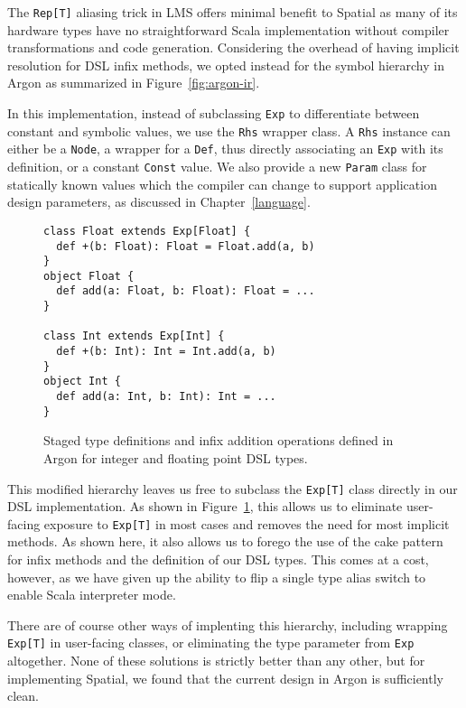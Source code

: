 The \texttt{Rep[T]} aliasing trick in LMS offers minimal benefit to Spatial as many of its hardware types have no straightforward Scala implementation without compiler transformations and code generation.
Considering the overhead of having implicit resolution for DSL infix methods, we opted instead for the symbol hierarchy in Argon as summarized in Figure~\ref{fig:argon-ir}.

In this implementation, instead of subclassing
\texttt{Exp} to differentiate between constant and symbolic values, we
use the \texttt{Rhs} wrapper class. A \texttt{Rhs} instance can either
be a \texttt{Node}, a wrapper for a \texttt{Def}, thus directly associating an \texttt{Exp} with its definition, or a constant \texttt{Const} value.
We also provide a new \texttt{Param} class for statically known values which
the compiler can change to support application design parameters, as discussed in Chapter~\ref{language}.

\begin{figure}
\begin{lstlisting}[language=ScalaBig]
class Float extends Exp[Float] {
  def +(b: Float): Float = Float.add(a, b)
}
object Float {
  def add(a: Float, b: Float): Float = ...
}

class Int extends Exp[Int] {
  def +(b: Int): Int = Int.add(a, b)
}
object Int {
  def add(a: Int, b: Int): Int = ...
}
\end{lstlisting}
\caption{Staged type definitions and infix addition operations defined in Argon for integer and floating point DSL types.}
\label{fig:argon-ir-example}
\end{figure}

This modified hierarchy leaves us free to subclass the \texttt{Exp[T]} class
directly in our DSL implementation. As shown in Figure~\ref{fig:argon-ir-example}, this allows us to eliminate user-facing
exposure to \texttt{Exp[T]} in most cases and removes the need for most
implicit methods. As shown here, it also allows us to forego the use of the cake pattern for infix methods and the definition of our DSL types.
This comes at a cost, however, as we have given up the ability to
flip a single type alias switch to enable Scala interpreter mode.

There are of course other ways of implenting this hierarchy, including
wrapping \texttt{Exp[T]} in user-facing classes, or eliminating the
type parameter from \texttt{Exp} altogether. None of these solutions
is strictly better than any other, but for implementing Spatial, we found
that the current design in Argon is sufficiently clean.

